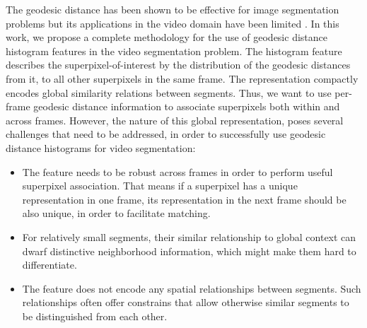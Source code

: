 \documentclass[runningheads]{llncs}
\begin{document}
The geodesic distance has been shown to be effective for image segmentation problems \cite{Krähenbühl2014,Bai:4408931} but its applications in the video domain have been limited \cite{Wang:7298961,Bai:4408931,Price:5540079,geohis}. In this work, we propose a complete methodology for the use of geodesic distance histogram features in the video segmentation problem. The histogram feature describes the superpixel-of-interest by the distribution of the geodesic distances from it, to all other superpixels in the same frame. The representation compactly encodes global similarity relations between segments. Thus, we want to use per-frame geodesic distance information to associate superpixels both within and across frames. However, the nature of this global representation, poses several challenges that need to be addressed, in order to successfully use geodesic distance histograms for video segmentation:
\begin{itemize}
\item The feature needs to be robust across frames in order to perform useful superpixel association. That means if a superpixel has a unique representation in one frame, its representation in the next frame should be also unique, in order to facilitate matching.
\item For relatively small segments, their similar relationship to global context can dwarf distinctive neighborhood information, which might make them hard to differentiate.
\item The feature does not encode any spatial relationships between segments. Such relationships often offer constrains that allow otherwise similar segments to be distinguished from each other.
\end{itemize}
\end{document}
